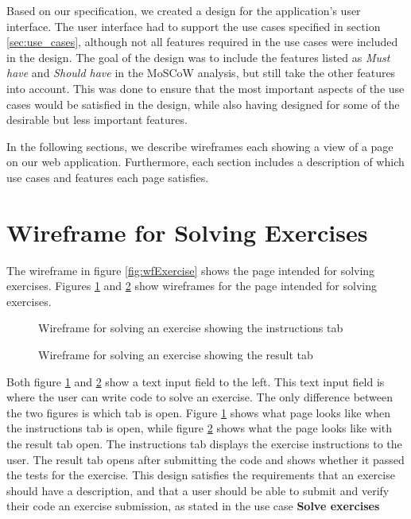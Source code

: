 Based on our specification, we created a design for the application's user interface. The user interface had to support the use cases specified in section \ref{sec:use_cases}, although not all features required in the use cases were included in the design. The goal of the design was to include the features listed as \textit{Must have} and \textit{Should have} in the MoSCoW analysis, but still take the other features into account. This was done to ensure that the most important aspects of the use cases would be satisfied in the design, while also having designed for some of the desirable but less important features.

In the following sections, we describe wireframes each showing a view of a page on our web application. Furthermore, each section includes a description of which use cases and features each page satisfies.

\section{Wireframe for Solving Exercises}
The wireframe in figure \ref{fig:wfExercise} shows the page intended for solving exercises.
Figures \ref{fig:wfExerciseInstructions} and \ref{fig:wfExerciseResult} show wireframes for the page intended for solving exercises.

\begin{figure}[H]
	\centering
	\caption{Wireframe for solving an exercise showing the instructions tab}
	\label{fig:wfExerciseInstructions}
\end{figure}

\begin{figure}[H]
	\centering
	\caption{Wireframe for solving an exercise showing the result tab}
	\label{fig:wfExerciseResult}
\end{figure}

Both figure \ref{fig:wfExerciseInstructions} and \ref{fig:wfExerciseResult} show a text input field to the left. This text input field is where the user can write code to solve an exercise.
The only difference between the two figures is which tab is open.
Figure \ref{fig:wfExerciseInstructions} shows what page looks like when the instructions tab is open, while figure \ref{fig:wfExerciseResult} shows what the page looks like with the result tab open.
The instructions tab displays the exercise instructions to the user.
The result tab opens after submitting the code and shows whether it passed the tests for the exercise.
This design satisfies the requirements that an exercise should have a description, and that a user should be able to submit and verify their code an exercise submission, as stated in the use case \textbf{Solve exercises}

